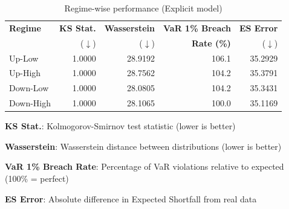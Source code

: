 \begin{table}[htbp]
\centering
\caption{Regime-wise performance (Explicit model)}
\label{tab:regime_performance}
\begin{tabular}{lrrrr}
\toprule
\textbf{Regime} & \textbf{KS Stat.} & \textbf{Wasserstein} & \textbf{VaR 1\% Breach} & \textbf{ES Error} \\
 & (\(\downarrow\)) & (\(\downarrow\)) & \textbf{Rate (\%)} & (\(\downarrow\)) \\
\midrule
Up-Low & 1.0000 & 28.9192 & 106.1 & 35.2929 \\
Up-High & 1.0000 & 28.7562 & 104.2 & 35.3791 \\
Down-Low & 1.0000 & 28.0805 & 104.2 & 35.3431 \\
Down-High & 1.0000 & 28.1065 & 100.0 & 35.1169 \\
\bottomrule
\end{tabular}
\begin{tablenotes}
\small
\item \textbf{KS Stat.}: Kolmogorov-Smirnov test statistic (lower is better)
\item \textbf{Wasserstein}: Wasserstein distance between distributions (lower is better)
\item \textbf{VaR 1\% Breach Rate}: Percentage of VaR violations relative to expected (100\% = perfect)
\item \textbf{ES Error}: Absolute difference in Expected Shortfall from real data
\end{tablenotes}
\end{table}